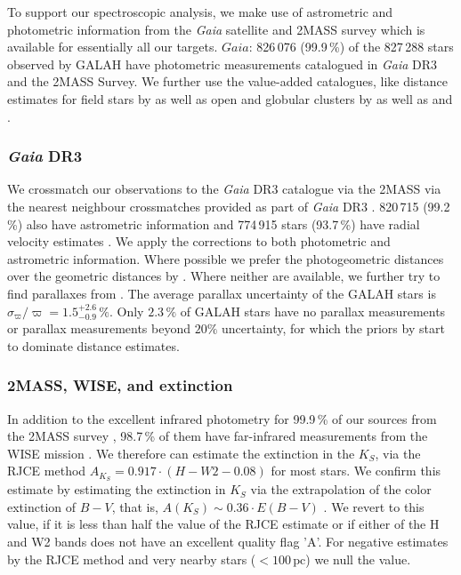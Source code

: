 \documentclass[
  journal=pasa,
  manuscript=research-paper, %
  year=2023,
  volume=37
]{cup-journal}
\newcommand{\Gaia}{\textit{Gaia}\xspace}
\begin{document}
To support our spectroscopic analysis, we make use of astrometric and photometric information from the \Gaia satellite \citep{Gaia-Collaboration2016} and 2MASS survey \citep{Skrutskie2006} which is available for essentially all our targets. $Gaia$: 826\,076 (99.9\,\%) of the 827\,288 stars observed by GALAH have photometric measurements catalogued in \Gaia DR3 and the 2MASS Survey. We further use the value-added catalogues, like distance estimates for field stars by \citep{BailerJones2021} as well as open and globular clusters by \citet{CantatGaudin2020} as well as \citet{Vasiliev2021} and \citet{Baumgardt2021}.

\subsubsection{\Gaia DR3}

We crossmatch our observations to the \Gaia DR3 catalogue \citep{Brown2021,Vallenari2022} via the 2MASS via the nearest neighbour crossmatches provided as part of \Gaia DR3 \citep{Torra2021}. 820\,715 (99.2\,\%) also have astrometric information \citep{Lindegren2021a} and 774\,915 stars (93.7\,\%) have radial velocity estimates \citep{Katz2022}. We apply the corrections to both photometric \citep{Riello2021} and astrometric \citep{Lindegren2021b}information. Where possible we prefer the photogeometric distances over the geometric distances by \citep{BailerJones2021}. Where neither are available, we further try to find parallaxes from \cite{vanLeeuwen2007}. The average parallax uncertainty of the GALAH stars is $\sigma_{\varpi} / \varpi = 1.5_{-0.9}^{+2.6}\,\mathrm{\%}$. Only $2.3\,\%$ of GALAH stars have no parallax measurements or parallax measurements beyond $20\%$ uncertainty, for which the priors by \citep{BailerJones2021} start to dominate distance estimates.

\subsubsection{2MASS, WISE, and extinction}

In addition to the excellent infrared photometry for 99.9\,\% of our sources from the 2MASS survey \citep{Skrutskie2006}, 98.7\,\% of them have far-infrared measurements from the WISE mission \citep{Cutri2013}. We therefore can estimate the extinction in the $K_S$, via the RJCE method \citep{Majewski2011} $A_{K_S}  = 0.917 \cdot \left( H - W2 - 0.08 \right)$ for most stars. We confirm this estimate by estimating the extinction in $K_S$ via the extrapolation of the color extinction of $B-V$, that is, $A(K_S) \sim 0.36 \cdot E(B-V)$ \citep{Cardelli1989}. We revert to this value, if it is less than half the value of the RJCE estimate or if either of the H and W2 bands does not have an excellent quality flag 'A'. For negative estimates by the RJCE method and very nearby stars ($<100\,\mathrm{pc}$) we null the value.
\end{document}
